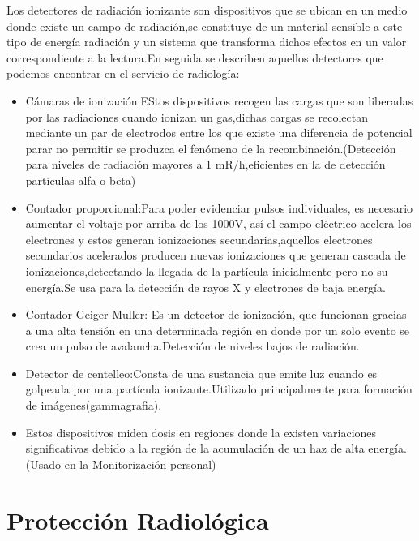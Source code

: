 \documentclass[12pt,fleqn]{book} %
\numberwithin{equation}{section} %
\numberwithin{figure}{section} %
\numberwithin{table}{section} %
\begin{document}
{Los detectores de radiación ionizante son dispositivos que se ubican en un medio donde existe un campo de radiación,se constituye de un  material sensible a este tipo de energía radiación y un sistema que transforma dichos efectos en un valor correspondiente a la lectura.En seguida se describen aquellos detectores que podemos encontrar en el servicio de radiología:

\begin{itemize}
 \item Cámaras de ionización:EStos dispositivos recogen las cargas que son liberadas por las radiaciones cuando ionizan un gas,dichas cargas se recolectan mediante un par de electrodos  entre los que existe una diferencia de potencial parar no permitir se produzca  el fenómeno de la recombinación.(Detección para niveles de radiación mayores a 1 mR$/$h,eficientes en la de detección partículas alfa o beta)
 
 \item Contador proporcional:Para poder evidenciar pulsos individuales, es necesario aumentar el voltaje por arriba de los 1000V, así el campo eléctrico acelera los electrones y estos generan ionizaciones secundarias,aquellos electrones secundarios acelerados producen nuevas ionizaciones que generan cascada de ionizaciones,detectando la llegada de la partícula inicialmente pero no su energía.Se usa para  la detección de rayos X y electrones de baja energía.

 
 \item Contador Geiger-Muller: Es un detector de ionización, que funcionan gracias a una alta tensión en una determinada región en donde por un solo evento se crea un pulso de avalancha.Detección de niveles bajos de radiación.
 
 
 \item Detector de centelleo:Consta de una sustancia que emite luz cuando es golpeada por una partícula ionizante.Utilizado principalmente para formación de imágenes(gammagrafia).
 
 
\item Estos dispositivos miden dosis en regiones donde la 
existen variaciones significativas debido a la región de la acumulación de un haz de alta energía.(Usado en la Monitorización personal)  
\end{itemize}


 

\section{Protección Radiológica}

}
\end{document}
